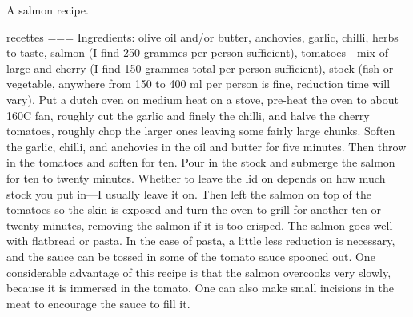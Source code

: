 A salmon recipe.

recettes
===
 Ingredients: olive oil and/or butter, anchovies, garlic, chilli, herbs to taste, salmon (I find 250 grammes per person sufficient), tomatoes—mix of large and cherry (I find 150 grammes total per person sufficient), stock (fish or vegetable, anywhere from 150 to 400 ml per person is fine, reduction time will vary). Put a dutch oven on medium heat on a stove, pre-heat the oven to about 160C fan, roughly cut the garlic and finely the chilli, and halve the cherry tomatoes, roughly chop the larger ones leaving some fairly large chunks. Soften the garlic, chilli, and anchovies in the oil and butter for five minutes. Then throw in the tomatoes and soften for ten. Pour in the stock and submerge the salmon for ten to twenty minutes. Whether to leave the lid on depends on how much stock you put in—I usually leave it on. Then left the salmon on top of the tomatoes so the skin is exposed and turn the oven to grill for another ten or twenty minutes, removing the salmon if it is too crisped. The salmon goes well with flatbread or pasta. In the case of pasta, a little less reduction is necessary, and the sauce can be tossed in some of the tomato sauce spooned out. One considerable advantage of this recipe is that the salmon overcooks very slowly, because it is immersed in the tomato. One can also make small incisions in the meat to encourage the sauce to fill it.